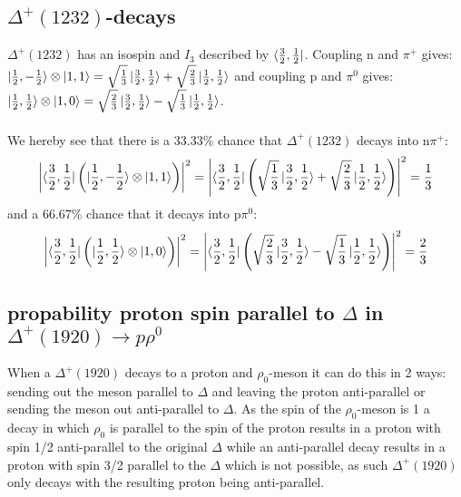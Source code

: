 \documentclass[10pt,a4paper,twoside]{article}
\begin{document}
\subsection{$\Delta^+(1232)$-decays}
$\Delta^+(1232)$  has an isospin and $I_3$ described by $\bra{\frac{3}{2},\frac{1}{2}}$. Coupling n and $\pi^+$ gives: $\ket{\frac{1}{2},-\frac{1}{2}}\otimes\ket{1,1} = \sqrt{\frac{1}{3}}\ket{\frac{3}{2},\frac{1}{2}} + \sqrt{\frac{2}{3}}\ket{\frac{1}{2},\frac{1}{2}}$ and coupling p and $\pi^0$ gives: $\ket{\frac{1}{2},\frac{1}{2}}\otimes\ket{1,0} = \sqrt{\frac{2}{3}}\ket{\frac{3}{2},\frac{1}{2}} - \sqrt{\frac{1}{3}}\ket{\frac{1}{2},\frac{1}{2}}$. \\\\
We hereby see that there is a 33.33\% chance that $\Delta^+(1232)$ decays into n$\pi^+$:
\begin{equation*}
\left|\bra{\frac{3}{2},\frac{1}{2}}\left(\ket{\frac{1}{2},-\frac{1}{2}}\otimes\ket{1,1}\right)\right|^2 = \left|\bra{\frac{3}{2},\frac{1}{2}}\left(\sqrt{\frac{1}{3}}\ket{\frac{3}{2},\frac{1}{2}} + \sqrt{\frac{2}{3}}\ket{\frac{1}{2},\frac{1}{2}}\right)\right|^2 = \frac{1}{3}
\end{equation*}
and a 66.67\% chance that it decays into p$\pi^0$:
\begin{equation}
	\left|\bra{\frac{3}{2},\frac{1}{2}}\left(\ket{\frac{1}{2},\frac{1}{2}}\otimes\ket{1,0}\right)\right|^2 = \left|\bra{\frac{3}{2},\frac{1}{2}}\left(\sqrt{\frac{2}{3}}\ket{\frac{3}{2},\frac{1}{2}} - \sqrt{\frac{1}{3}}\ket{\frac{1}{2},\frac{1}{2}}\right)\right|^2 = \frac{2}{3}
\end{equation}
\subsection{propability proton spin parallel to $\Delta$ in $\Delta^+(1920) \rightarrow p\rho^0$}
When a $\Delta^+(1920)$ decays to a proton and $\rho_0$-meson it can do this in 2 ways: sending out the meson parallel to $\Delta$ and leaving the proton anti-parallel or sending the meson out anti-parallel to $\Delta$. As the spin of the $\rho_0$-meson is 1 a decay in which $\rho_0$ is parallel to the spin of the proton results in a proton with spin 1/2 anti-parallel to the original $\Delta$ while an anti-parallel decay results in a proton with spin 3/2 parallel to the $\Delta$ which is not possible, as such $\Delta^+(1920)$ only decays with the resulting proton being anti-parallel.
\end{document}
